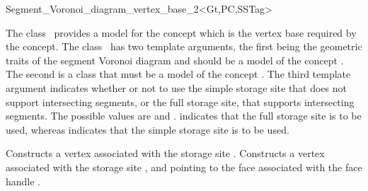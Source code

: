 

\begin{ccRefClass}{Segment_Voronoi_diagram_vertex_base_2<Gt,PC,SSTag>}


\ccDefinition

The class \ccRefName\ provides a model for the
 concept which is the vertex
base required by the 
concept. The class \ccRefName\ has two template arguments, the first
being the geometric traits of the segment Voronoi diagram and should be a
model of the concept . The second
is a class that must be a model of the concept
. The third template argument indicates whether
or not to use the simple storage site that does not support
intersecting segments, or the full storage site, that supports
intersecting segments. The possible values are 
and .  indicates that the
full storage site is to be used, whereas 
indicates that the simple storage site is to be used.



\ccIsModel
{}

\ccCreation
{}  %

\ccGlue
{}
{Constructs a vertex associated with the storage site .}
\ccGlue
{}
	      {Constructs a vertex associated with
		the storage site ,
		and pointing to the face associated with the face
		handle .}




\end{ccRefClass}
